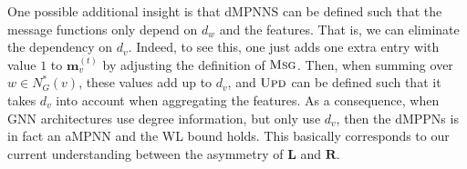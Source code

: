 \smallskip
\noindent
One possible additional insight is that dMPNNS can be defined such that
the message functions  only depend on $d_w$ and the features. That is, we 
can eliminate the dependency on $d_v$.
Indeed, to see this, one just adds one extra entry with value $1$ to $\mathbf{m}_v^{(t)}$ by adjusting the definition of $\textsc{Msg}$. Then, when summing over
$w\in N_G^*(v)$, these values add up to $d_v$, and $\textsc{Upd}$ can be defined such that it takes $d_v$ into account when aggregating the features. 
As a consequence, when GNN architectures use degree information, but only use $d_v$, then the dMPPNs is in fact an aMPNN and the WL bound holds. This basically corresponds to our current understanding between the asymmetry of $\mathbf{L}$ and $\mathbf{R}$. 












